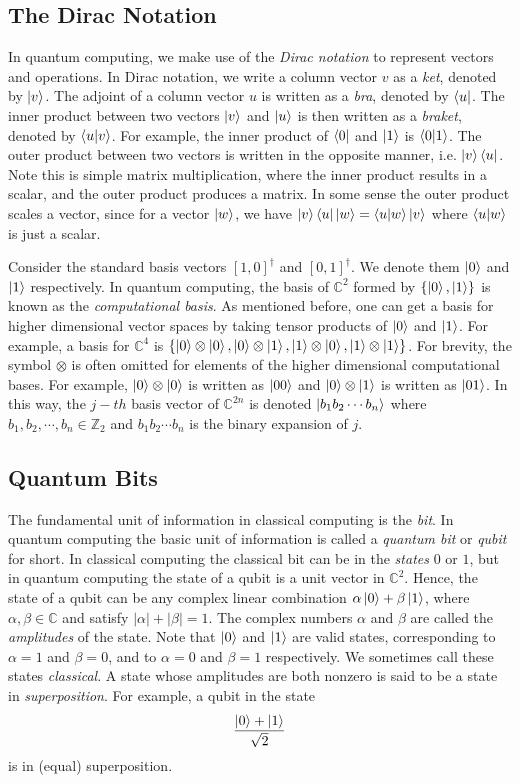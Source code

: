 \documentclass[12pt]{dalthesis}
\begin{document}
\subsection{The Dirac Notation}
In quantum computing, we make use of the \emph{Dirac notation} to represent vectors and operations. In Dirac notation, we write a column vector $v$ as a \emph{ket}, denoted by $\ket{v}$. The adjoint of a column vector $u$ is written as a \emph{bra}, denoted by $\bra{u}$. The inner product between two vectors $\ket{v}$ and $\ket{u}$ is then written as a \emph{braket}, denoted by $\braket{u|v}$. For example, the inner product of $\bra{0}$ and $\ket{1}$ is $\braket{0|1}$. The outer product between two vectors is written in the opposite manner, i.e. $\ket{v} \bra{u}$. Note this is simple matrix multiplication, where the inner product results in a scalar, and the outer product produces a matrix. In some sense the outer product scales a vector, since for a vector $\ket{w}$, we have $\ket{v}\bra{u} \ket{w} = \braket{u|w}\ket{v}$ where $\braket{u|w}$ is just a scalar.

Consider the standard basis vectors $[1, 0]^{\dag}$ and $[0, 1]^{\dag}$. We denote them $\ket{0}$ and $\ket{1}$ respectively. In quantum computing, the basis of $\mathbb{C}^2$ formed by $\{ \ket{0} , \ket{1} \}$ is known as the \emph{computational basis}. As mentioned before, one can get a basis for higher dimensional vector spaces by taking tensor products of $\ket{0}$ and $\ket{1}$. For example, a basis for $\mathbb{C}^4$ is $\{ \ket{0} \otimes \ket{0}, \ket{0} \otimes \ket{1}, \ket{1} \otimes \ket{0}, \ket{1} \otimes \ket{1} \}$. For brevity, the symbol $\otimes$ is often omitted for elements of the higher dimensional computational bases. For example, $\ket{0} \otimes \ket{0}$ is written as $\ket{00}$ and $\ket{0} \otimes \ket{1}$ is written as $\ket{01}$. In this way, the $j-th$ basis vector of $\mathbb{C}^{2n}$ is denoted $\ket{b_1 b_2 \cdots b_n}$ where $b_1, b_2, \cdots , b_n \in \mathbb{Z}_2$ and $b_1 b_2 \cdots b_n$ is the binary expansion of $j$.

\subsection{Quantum Bits}
The fundamental unit of information in classical computing is the \emph{bit}. In quantum computing the basic unit of information is called a \emph{quantum bit} or \emph{qubit} for short. In classical computing the classical bit can be in the \emph{states} $0$ or $1$, but in quantum computing the state of a qubit is a unit vector in $\mathbb{C}^2$. Hence, the state of a qubit can be any complex linear combination $\alpha \ket{0} + \beta \ket{1}$, where $\alpha , \beta \in \mathbb{C}$ and satisfy $|\alpha | + |\beta | = 1$. The complex numbers $\alpha$ and $\beta$ are called the \emph{amplitudes} of the state. Note that $\ket{0}$ and $\ket{1}$ are valid states, corresponding to $\alpha = 1$ and $\beta = 0$, and to $\alpha = 0$ and $\beta = 1$ respectively. We sometimes call these states \emph{classical}. A state whose amplitudes are both nonzero is said to be a state in \emph{superposition}. For example, a qubit in the state \[ \frac{\ket{0} + \ket{1}}{\sqrt{2}} \] is in (equal) superposition.
\end{document}
